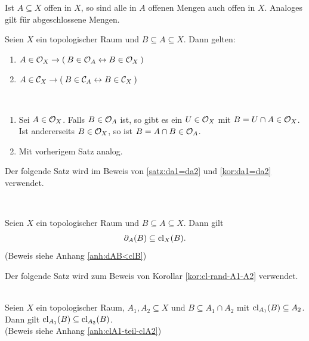     Ist $A \subseteq X$ offen in $X$, so sind alle in $A$ offenen Mengen auch offen in $X$. Analoges gilt für abgeschlossene Mengen.
    \begin{kor}\label{kor:OX-OA-CX-CA}
        Seien $X$ ein topologischer Raum und $B \subseteq A \subseteq X$. Dann gelten:
        \begin{enumerate}
            \item $A \in \mathcal{O}_X \to (\: B \in \mathcal{O}_A \leftrightarrow B \in \mathcal{O}_X \:)$
            \item $A \in \mathcal{C}_X \to (\: B \in \mathcal{C}_A \leftrightarrow B \in \mathcal{C}_X \:)$
        \end{enumerate}
    \end{kor}
    \begin{bew}\ 
        \begin{enumerate}
            \item Sei $A \in \mathcal{O}_X$. Falls $B \in \mathcal{O}_A$ ist, so gibt es ein $U \in \mathcal{O}_X$ mit $B = U \cap A \in \mathcal{O}_X$.\\
            Ist andererseits $B \in \mathcal{O}_X$, so ist $B = A \cap B \in \mathcal{O}_A$.
            \item Mit vorherigem Satz analog.
        \end{enumerate}
    \end{bew}


    Der folgende Satz wird im Beweis von \ref{satz:da1=da2} und \ref{kor:da1=da2} verwendet.
    \begin{satz} \label{satz:dAB<clB}\ \vspace{8pt}

        \noindent
        Seien $X$ ein topologischer Raum und $B \subseteq A \subseteq X$. Dann gilt 
        \begin{align*}
            \partial_A(B) \subseteq \text{cl}_X(B).
        \end{align*}
        (Beweis siehe Anhang \ref{anh:dAB<clB})
    \end{satz}


    Der folgende Satz wird zum Beweis von Korollar \ref{kor:cl-rand-A1-A2} verwendet.
    \begin{satz}\label{satz:clA1-teil-clA2}\ \\
        Seien $X$ ein topologischer Raum, ${A_1, A_2 \subseteq X}$ und ${B \subseteq A_1 \cap A_2}$ mit ${\text{cl}_{A_1}(B) \subseteq A_2}$. Dann gilt ${\text{cl}_{A_1}(B) \subseteq \text{cl}_{A_2}(B)}$.\\
        (Beweis siehe Anhang \ref{anh:clA1-teil-clA2})
    \end{satz}


